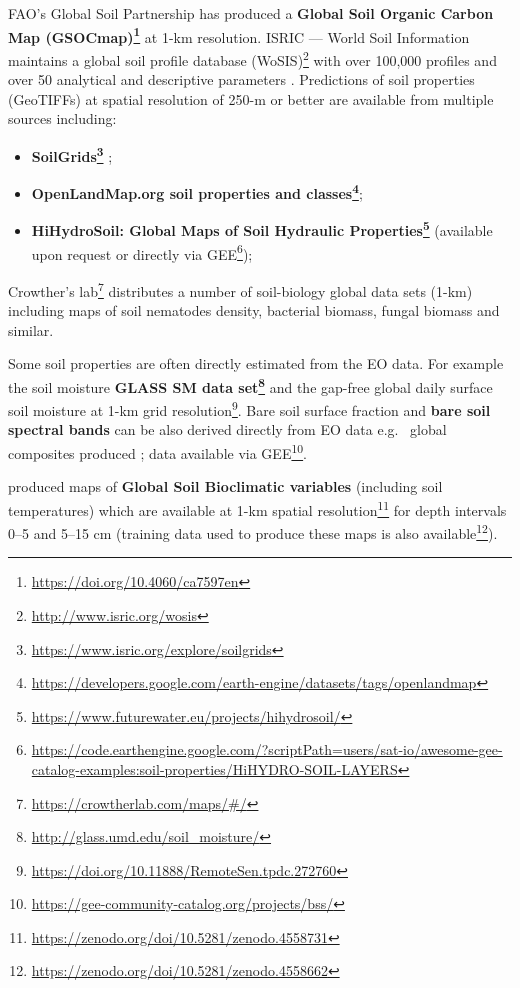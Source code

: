 \documentclass[
  graybox,natbib,nospthms]{svmono}
\providecommand{\tightlist}{%
  \setlength{\itemsep}{0pt}\setlength{\parskip}{0pt}}
\providecommand{\tightlist}{\setlength{\itemsep}{0pt}\setlength{\parskip}{0pt}}
\renewcommand{\href}[2]{#2 (\url{#1})}
\renewcommand{\href}[2]{#2\footnote{\url{#1}}}
\begin{document}
FAO's Global Soil Partnership has produced a \textbf{\href{https://doi.org/10.4060/ca7597en}{Global Soil Organic Carbon Map (GSOCmap)}} at 1-km resolution.
ISRIC --- World Soil Information maintains \href{http://www.isric.org/wosis}{a global soil profile database (WoSIS)}
with over 100,000 profiles and over 50 analytical and descriptive parameters \citep{batjes2020standardised}. Predictions of soil properties (GeoTIFFs) at spatial resolution of
250-m or better are available from multiple sources including:

\begin{itemize}
\tightlist
\item
  \textbf{\href{https://www.isric.org/explore/soilgrids}{SoilGrids}} \citep{poggio2021soilgrids};
\item
  \textbf{\href{https://developers.google.com/earth-engine/datasets/tags/openlandmap}{OpenLandMap.org soil properties and classes}};
\item
  \textbf{\href{https://www.futurewater.eu/projects/hihydrosoil/}{HiHydroSoil: Global Maps of Soil Hydraulic Properties}} (available upon request or directly \href{https://code.earthengine.google.com/?scriptPath=users/sat-io/awesome-gee-catalog-examples:soil-properties/HiHYDRO-SOIL-LAYERS}{via GEE});
\end{itemize}

\href{https://crowtherlab.com/maps/\#/}{Crowther's lab} distributes a number of soil-biology global data sets (1-km)
including maps of soil nematodes density, bacterial biomass, fungal biomass and similar.

Some soil properties are often directly estimated from the EO data. For example the soil moisture
\textbf{\href{http://glass.umd.edu/soil_moisture/}{GLASS SM data set}} and the \href{https://doi.org/10.11888/RemoteSen.tpdc.272760}{gap-free global daily surface soil moisture at 1-km grid resolution}.
Bare soil surface fraction and \textbf{bare soil spectral bands} can be also derived directly from EO data e.g.~
global composites produced \citet{dematte2020bare}; data available via \href{https://gee-community-catalog.org/projects/bss/}{GEE}.

\citet{lembrechts2022global} produced maps of \textbf{Global Soil Bioclimatic variables} (including soil temperatures)
which are available at \href{https://zenodo.org/doi/10.5281/zenodo.4558731}{1-km spatial resolution} for depth intervals 0--5 and 5--15 cm (training data used to produce these maps is \href{https://zenodo.org/doi/10.5281/zenodo.4558662}{also available}).
\end{document}
